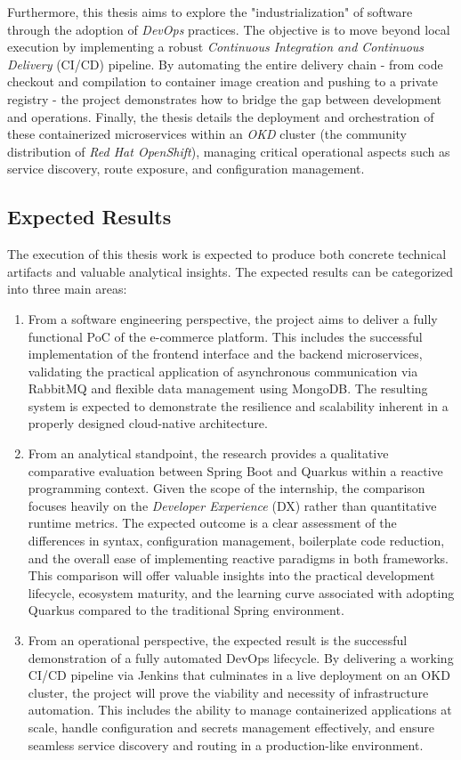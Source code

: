 Furthermore, this thesis aims to explore the "industrialization" of software through the adoption of \textit{DevOps} practices. The objective is to move beyond local execution by implementing a robust \textit{Continuous Integration and Continuous Delivery} (\gls{CI/CD}) pipeline. By automating the entire delivery chain - from code checkout and compilation to container image creation and pushing to a private registry - the project demonstrates how to bridge the gap between development and operations. Finally, the thesis details the deployment and orchestration of these containerized microservices within an \textit{OKD} cluster (the community distribution of \textit{Red Hat OpenShift}), managing critical operational aspects such as service discovery, route exposure, and configuration management.

\subsection[Expected Results]{Expected Results}

The execution of this thesis work is expected to produce both concrete technical artifacts and valuable analytical insights. The expected results can be categorized into three main areas:

\begin{enumerate}
    \item From a software engineering perspective, the project aims to deliver a fully functional \gls{PoC} of the e-commerce platform. This includes the successful implementation of the frontend interface and the backend microservices, validating the practical application of asynchronous communication via RabbitMQ and flexible data management using MongoDB. The resulting system is expected to demonstrate the resilience and scalability inherent in a properly designed cloud-native architecture.
    \item From an analytical standpoint, the research provides a qualitative comparative evaluation between Spring Boot and Quarkus within a reactive programming context. Given the scope of the internship, the comparison focuses heavily on the \textit{Developer Experience} (\gls{DX}) rather than quantitative runtime metrics. The expected outcome is a clear assessment of the differences in syntax, configuration management, boilerplate code reduction, and the overall ease of implementing reactive paradigms in both frameworks. This comparison will offer valuable insights into the practical development lifecycle, ecosystem maturity, and the learning curve associated with adopting Quarkus compared to the traditional Spring environment.
    \item From an operational perspective, the expected result is the successful demonstration of a fully automated DevOps lifecycle. By delivering a working \gls{CI/CD} pipeline via Jenkins that culminates in a live deployment on an OKD cluster, the project will prove the viability and necessity of infrastructure automation. This includes the ability to manage containerized applications at scale, handle configuration and secrets management effectively, and ensure seamless service discovery and routing in a production-like environment.
\end{enumerate} 


